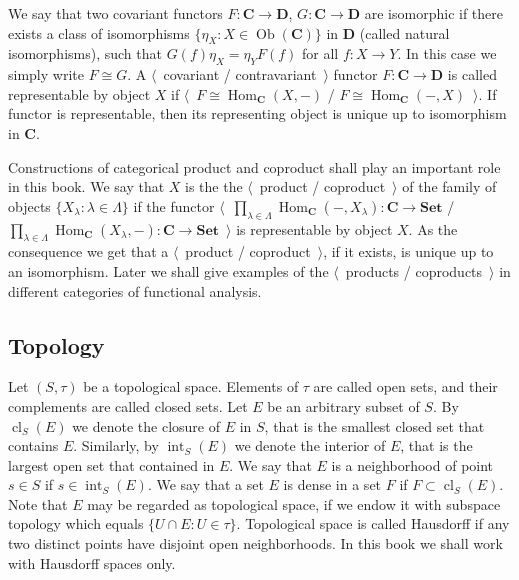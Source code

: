 We say that two covariant functors $F:\mathbf{C}\to\mathbf{D}$,
$G:\mathbf{C}\to\mathbf{D}$ are isomorphic if there exists a class of
isomorphisms $ \{\eta_X:X\in\operatorname{Ob}(\mathbf{C}) \}$ in $\mathbf{D}$
(called natural isomorphisms), such that $G(f)\eta_X=\eta_Y F(f)$ for all
$f:X\to Y$. In this case we simply write $F\cong G$. A $\langle$~covariant /
contravariant~$\rangle$ functor $F:\mathbf{C}\to\mathbf{D}$ is called
representable by object $X$ if
$\langle$~$F\cong\operatorname{Hom}_{\mathbf{C}}(X,-)$ /
$F\cong\operatorname{Hom}_{\mathbf{C}}(-,X)$~$\rangle$. If functor is
representable, then its representing object is unique up to isomorphism in
$\mathbf{C}$.

Constructions of categorical product and coproduct shall play an important role
in this book. We say that $X$ is the the $\langle$~product / coproduct~$\rangle$
of the family of objects $ \{X_\lambda:\lambda\in\Lambda \}$ if the functor
$\langle$~$
\prod_{\lambda\in\Lambda}\operatorname{Hom}_{\mathbf{C}}(-,X_{\lambda})
:\mathbf{C}\to\mathbf{Set}$
/
$
\prod_{\lambda\in\Lambda}\operatorname{Hom}_{\mathbf{C}}(X_{\lambda},-)
:\mathbf{C}\to\mathbf{Set}$~$\rangle$
is representable by object $X$. As the consequence we get that a
$\langle$~product / coproduct~$\rangle$, if it exists, is unique up to an
isomorphism. Later we shall give examples of the $\langle$~products /
coproducts~$\rangle$ in different categories of functional analysis. 



\subsection{
  Topology
}\label{SubSectionTopology}

Let $(S,\tau)$ be a topological space. Elements of $\tau$ are called open sets,
and their complements are called closed sets. Let $E$ be an arbitrary subset of
$S$. By $\operatorname{cl}_S(E)$ we denote the closure of $E$ in $S$, that is
the smallest closed set that contains $E$. Similarly, by
$\operatorname{int}_S(E)$ we denote the interior of $E$, that is the largest
open set that contained in $E$. We say that $E$ is a neighborhood of point 
$s\in S$ if $s\in \operatorname{int}_S(E)$. We say that a set $E$ is dense 
in a set $F$ if $F\subset\operatorname{cl}_S(E)$. Note that $E$ may be regarded
as topological space, if we endow it with subspace topology which equals $
\{U\cap E:U\in\tau \}$. Topological space is called Hausdorff if any two
distinct points have disjoint open neighborhoods. In this book we shall work
with Hausdorff spaces only.


